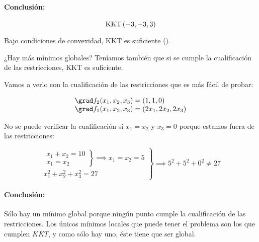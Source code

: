 \begin{problem}[3]
\paragraph{Conclusión:}

\[\mbox{KKT}\left(-3,-3,3\right)\]

\spart 

Bajo condiciones de convexidad, KKT es suficiente ().

¿Hay más mínimos globales?
Teníamos también que si se cumple la cualificación de las restricciones, KKT es suficiente.

Vamos a verlo con la cualificación de las restricciones que es más fácil de probar:

\[
	\begin{array}{l}
		\grad f_2(x_1,x_2,x_3) = (1,1,0)\\
		\grad f_1(x_1,x_2,x_3) = (2x_1,2x_2,2x_3)
	\end{array}
\]

No se puede verificar la cualificación si $x_1 = x_2$ y $x_3 = 0$ porque estamos fuera de las restricciones:

\[
\left.\begin{array}{l}
	\left.
	\begin{array}{r}
		x_1+x_2 = 10\\
		x_1=x_2
	\end{array}\right\}\implies x_1=x_2=5\\
	x_1^2+x_2^2+x_3^2 = 27
\end{array}
\right\}\implies 5^2+5^2+0^2 ≠ 27
\]

\paragraph{Conclusión:}

Sólo hay un mínimo global porque ningún punto cumple la cualificación de las restricciones.
%
Los únicos mínimos locales que puede tener el problema son los que cumplen $KKT$, y como sólo hay uno, éste tiene que ser global.

\end{problem}

